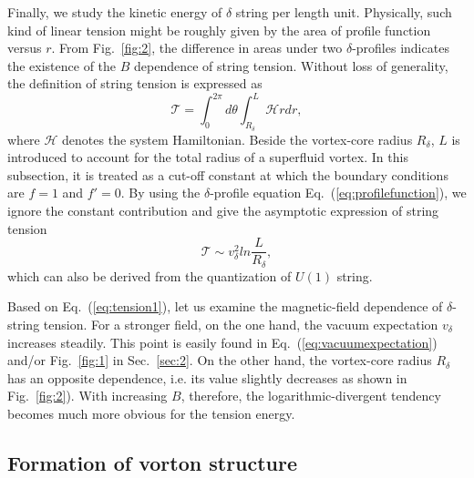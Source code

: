 Finally, we study the kinetic energy of $\delta$ string per length unit. Physically, such kind of
linear tension might be roughly given by the area of profile function versus $r$. From Fig.~\ref{fig:2},
the difference in areas under two $\delta$-profiles indicates the existence of the $B$ dependence of
string tension.
Without loss of generality, the definition of string tension is expressed as
\begin{equation}
\mathcal{T} = \int^{2\pi}_{0}d\theta \int^L_{R_\delta}
\mathcal{H} rdr
\label{eq:tension},
\end{equation}
where $\mathcal{H}$ denotes the system Hamiltonian.
Beside the vortex-core radius $R_\delta$, $L$ is introduced to account for the total radius of a
superfluid vortex. In this subsection, it is treated as a cut-off constant at which the boundary
conditions are $f =1$ and $f' =0$.
By using the $\delta$-profile equation Eq.~(\ref{eq:profilefunction}), we ignore the constant
contribution and give the asymptotic expression of string tension
\begin{equation}
  \label{eq:tension1}
  \mathcal{T} \sim v_\delta^2 ln\frac{L}{R_\delta},
\end{equation}
which can also be derived from the quantization of $U(1)$ string.

Based on Eq.~(\ref{eq:tension1}), let us examine the magnetic-field dependence of $\delta$-string tension.
For a stronger field, on the one hand, the vacuum expectation $v_\delta$ increases steadily.
This point is easily found in Eq.~(\ref{eq:vacuumexpectation}) and/or Fig.~\ref{fig:1} in Sec.~\ref{sec:2}.
On the other hand, the vortex-core radius $R_\delta$ has an opposite dependence, i.e. its value slightly
decreases as shown in Fig.~\ref{fig:2}). With increasing $B$, therefore, the logarithmic-divergent
tendency becomes much more obvious for the tension energy. 


\subsection{Formation of vorton structure }
\label{sssec:5}

